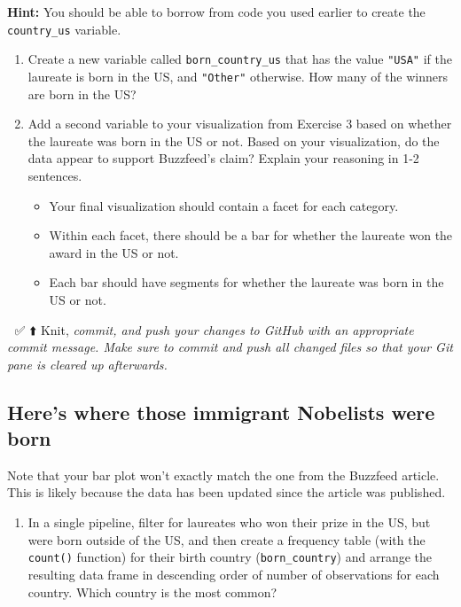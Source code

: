 \documentclass[
]{article}
\providecommand{\tightlist}{%
  \setlength{\itemsep}{0pt}\setlength{\parskip}{0pt}}
\begin{document}
\begin{marginfigure}
\textbf{Hint:} You should be able to borrow from code you used earlier
to create the \texttt{country\_us} variable.
\end{marginfigure}

\begin{enumerate}
\def\labelenumi{\arabic{enumi}.}
\setcounter{enumi}{3}
\item
  Create a new variable called \texttt{born\_country\_us} that has the
  value \texttt{"USA"} if the laureate is born in the US, and
  \texttt{"Other"} otherwise. How many of the winners are born in the
  US?
\item
  Add a second variable to your visualization from Exercise 3 based on
  whether the laureate was born in the US or not. Based on your
  visualization, do the data appear to support Buzzfeed's claim? Explain
  your reasoning in 1-2 sentences.

  \begin{itemize}
  \tightlist
  \item
    Your final visualization should contain a facet for each category.
  \item
    Within each facet, there should be a bar for whether the laureate
    won the award in the US or not.
  \item
    Each bar should have segments for whether the laureate was born in
    the US or not.
  \end{itemize}
\end{enumerate}

🧶 ✅ ⬆️ Knit, \emph{commit, and push your changes to GitHub with an
appropriate commit message. Make sure to commit and push all changed
files so that your Git pane is cleared up afterwards.}

\subsection{Here's where those immigrant Nobelists were
born}\label{heres-where-those-immigrant-nobelists-were-born}

\begin{marginfigure}
Note that your bar plot won't exactly match the one from the Buzzfeed
article. This is likely because the data has been updated since the
article was published.
\end{marginfigure}

\begin{enumerate}
\def\labelenumi{\arabic{enumi}.}
\setcounter{enumi}{5}
\tightlist
\item
  In a single pipeline, filter for laureates who won their prize in the
  US, but were born outside of the US, and then create a frequency table
  (with the \texttt{count()} function) for their birth country
  (\texttt{born\_country}) and arrange the resulting data frame in
  descending order of number of observations for each country. Which
  country is the most common?
\end{enumerate}
\end{document}
